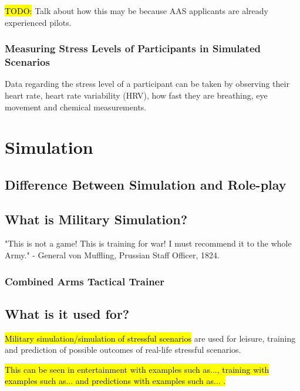 \documentclass{article}
\begin{document}
\hl{TODO:} Talk about how this may be because AAS applicants are already experienced pilots.

\subsubsection{Measuring Stress Levels of Participants in Simulated Scenarios}

Data regarding the stress level of a participant can be taken by observing their heart rate, heart rate variability (HRV), how fast they are breathing, eye movement and chemical measurements. \cite{8797889}

\section{Simulation}

\subsection{Difference Between Simulation and Role-play}



\subsection{What is Military Simulation?}

"This is not a game! This is training for war! I must recommend it to the whole Army." - General von Muffling, Prussian Staff Officer, 1824.

\subsubsection{Combined Arms Tactical Trainer}




\subsection{What is it used for?}

\hl{Military simulation/simulation of stressful scenarios} are used for leisure, training and prediction of possible outcomes of real-life stressful scenarios.

\hl{This can be seen in entertainment with examples such as..., training with examples such as... and predictions with examples such as... .}
\end{document}
